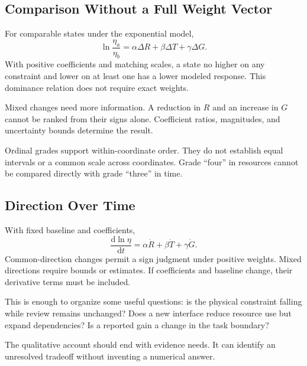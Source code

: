 \subsection{Comparison Without a Full Weight Vector}

For comparable states under the exponential model,
\begin{equation}
 \ln\frac{\eta_a}{\eta_b}
 =\alpha\Delta R+\beta\Delta T+\gamma\Delta G.
\end{equation}
With positive coefficients and matching scales, a state no higher on any constraint and lower on at least one has a lower modeled response. This dominance relation does not require exact weights.

Mixed changes need more information. A reduction in $R$ and an increase in $G$ cannot be ranked from their signs alone. Coefficient ratios, magnitudes, and uncertainty bounds determine the result.

Ordinal grades support within-coordinate order. They do not establish equal intervals or a common scale across coordinates. Grade “four” in resources cannot be compared directly with grade “three” in time.

\subsection{Direction Over Time}

With fixed baseline and coefficients,
\begin{equation}
 \frac{\mathrm d\ln\eta}{\mathrm dt}
 =\alpha\dot R+\beta\dot T+\gamma\dot G.
\end{equation}
Common-direction changes permit a sign judgment under positive weights. Mixed directions require bounds or estimates. If coefficients and baseline change, their derivative terms must be included.

This is enough to organize some useful questions: is the physical constraint falling while review remains unchanged? Does a new interface reduce resource use but expand dependencies? Is a reported gain a change in the task boundary?

The qualitative account should end with evidence needs. It can identify an unresolved tradeoff without inventing a numerical answer.

